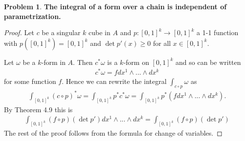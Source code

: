 \documentclass[20pt]{article}
\theoremstyle{plain}
\theoremstyle{definition}
\newtheorem*{problem}{Problem}
\begin{document}
\begin{problem}{4.25}
	\textbf{The integral of a form over a chain is independent of parametrization.}
\end{problem}

\begin{proof}
	Let $c$ be a singular $k$ cube in $A$ and $p: [0,1]^k \to [0,1]^k$ a 1-1 function with
	$p([0,1]^k) = [0,1]^k$ and $\det p'(x) \geq 0$ for all $x \in [0,1]^k$.

	Let $\omega$ be a $k$-form in $A$.  Then $c^*\omega$ is a $k$-form on $[0,1]^k$ and so can be written
	\begin{align*}
		c^*\omega = f dx^1 \wedge ... \wedge dx^k
	\end{align*}
	for some function $f$.
	Hence we can rewrite the integral $\int_{c \circ p} \omega$ as
	\begin{align*}
		\int_{[0,1]^k} (c \circ p)^* \omega =
		\int_{[0,1]^k} p^* c^* \omega =
		\int_{[0,1]^k} p^*(f dx^1 \wedge...\wedge dx^k).
	\end{align*}
	By Theorem 4.9 this is
	\begin{align*}
		\int_{[0,1]^k} (f \circ p) (\det p') dx^1 \wedge... \wedge dx^k =
		\int_{[0,1]^k} (f \circ p) (\det p')
	\end{align*}
	The rest of the proof follows from the formula for change of variables.
\end{proof}
\end{document}
